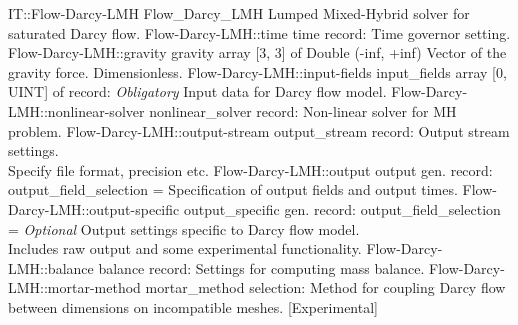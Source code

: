 \begin{RecordType}
	{IT::Flow-Darcy-LMH}
	{Flow{\_}Darcy{\_}LMH}
	{}%
	{}%
	{{{Lumped Mixed-Hybrid solver for saturated Darcy flow.}%
}}
		\RecKey
			{Flow-Darcy-LMH::time}
			{time}
			{{record: }}{}
			{ \ValueDefault{{\{}{\}}}}
			{{{Time governor setting.}%
}}
		\RecKey
			{Flow-Darcy-LMH::gravity}
			{gravity}
			{{array [3, 3] of }{Double (-inf, +inf)}}{}
			{ \ValueDefault{[0, 0, -1]}}
			{{{Vector of the gravity force.
Dimensionless.}%
}}
		\RecKey
			{Flow-Darcy-LMH::input-fields}
			{input{\_}fields}
			{{array [0, UINT] of }{record: }}{}
			{ \it{Obligatory}}
			{{{Input data for Darcy flow model.}%
}}
		\RecKey
			{Flow-Darcy-LMH::nonlinear-solver}
			{nonlinear{\_}solver}
			{{record: }}{}
			{ \ValueDefault{{\{}{\}}}}
			{{{Non-linear solver for MH problem.}%
}}
		\RecKey
			{Flow-Darcy-LMH::output-stream}
			{output{\_}stream}
			{{record: }}{}
			{ \ValueDefault{{\{}{\}}}}
			{{{Output stream settings.}\\{
 Specify file format, precision etc.}%
}}
		\RecKey
			{Flow-Darcy-LMH::output}
			{output}
			{{gen. record: }}{{output{\_}field{\_}selection}{ = }}
			{ }
			{{{Specification of output fields and output times.}%
}}
		\RecKey
			{Flow-Darcy-LMH::output-specific}
			{output{\_}specific}
			{{gen. record: }}{{output{\_}field{\_}selection}{ = }}
			{ \it{Optional}}
			{{{Output settings specific to Darcy flow model.}\\{
Includes raw output and some experimental functionality.}%
}}
		\RecKey
			{Flow-Darcy-LMH::balance}
			{balance}
			{{record: }}{}
			{ \ValueDefault{{\{}{\}}}}
			{{{Settings for computing mass balance.}%
}}
		\RecKey
			{Flow-Darcy-LMH::mortar-method}
			{mortar{\_}method}
			{{selection: }}{}
			{ }
			{{{Method for coupling Darcy flow between dimensions on incompatible meshes. [Experimental]}%
}}
\end{RecordType}
